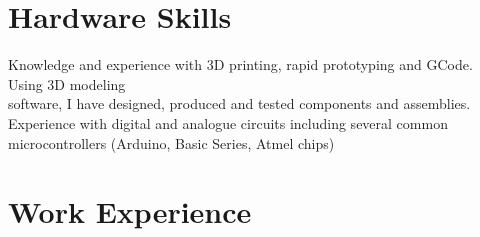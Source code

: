 \documentclass[a4paper,10pt]{article} %
\begin{document}

\section{Hardware Skills}
Knowledge and experience with 3D printing, rapid prototyping and GCode. Using 3D modeling\\
software, I have designed, produced and tested components and assemblies.\\
Experience with digital and analogue circuits including several common microcontrollers (Arduino, Basic Series, Atmel chips) \\
\vspace{0mm}



\section{Work Experience}
\end{document}
